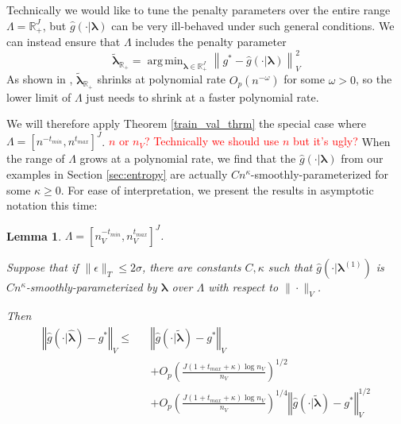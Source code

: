 \documentclass[12pt]{article}
\newtheorem{lemma}{Lemma}
\DeclareMathOperator*{\argmin}{arg\,min}
\begin{document}
Technically we would like to tune the penalty parameters over the entire range $\Lambda = \mathbb{R}^J_+$, but $\hat g(\cdot | \boldsymbol{\lambda})$ can be very ill-behaved under such general conditions. We can instead ensure that $\Lambda$ includes the penalty parameter
\begin{equation}
\label{eq:true_oracle}
\tilde{\boldsymbol{\lambda}}_{\mathbb{R}_+}
= \argmin_{\boldsymbol{\lambda} \in \mathbb{R}^J_+}\left \| g^* - \hat{g}(\cdot | \boldsymbol \lambda) \right \|^2_V
\end{equation}
As shown in \citet{van2000empirical}, $\tilde{\boldsymbol{\lambda}}_{\mathbb{R}_+}$ shrinks at polynomial rate $O_p(n^{-\omega})$ for some $\omega>0$, so the lower limit of $\Lambda$ just needs to shrink at a faster polynomial rate.

We will therefore apply Theorem \ref{train_val_thrm} the special case where $\Lambda = [n^{-t_{min}},n^{t_{max}}]^{J}$. 
\textcolor{red}{$n$ or $n_V$? Technically we should use $n$ but it's ugly?}
When the range of $\Lambda$ grows at a polynomial rate, we find that the $\hat g(\cdot | \boldsymbol{\lambda})$ from our examples in Section \ref{sec:entropy} are actually $Cn^\kappa$-smoothly-parameterized for some $\kappa \ge 0$. For ease of interpretation, we present the results in asymptotic notation this time:

\begin{lemma}
	\label{lemma:train_val_special}
	$\Lambda=[n_{V}^{-t_{min}},n_{V}^{t_{max}}]^{J}$.
	
	Suppose that if $\|\epsilon\|_{T}\le2\sigma$, there are constants
	$C,\kappa$ such that $\hat{g}(\cdot|\boldsymbol{\lambda}^{(1)})$ is $Cn^\kappa$-smoothly-parameterized by $\boldsymbol{\lambda}$ over $\Lambda$ with respect to $\|\cdot \|_V$.
	
	Then
	\begin{eqnarray}
	\left\Vert \hat{g}(\cdot|\hat{\boldsymbol{\lambda}})-g^{*}\right\Vert _{V}\le 
	&& \left\Vert \hat{g}(\cdot|\tilde{\boldsymbol{\lambda}})-g^{*}\right\Vert _{V} \label{eq:asym_train_val_theorem1} \\
	&& + O_p \left(\frac{J\left(1+t_{max}+\kappa\right)\log n_{V}}{n_{V}}\right)^{1/2} \label{eq:asym_train_val_theorem2} \\
	&& + O_p \left(\frac{J\left(1+t_{max}+\kappa\right)\log n_{V}}{n_{V}}\right)^{1/4} \left\Vert \hat{g}(\cdot|\tilde{\boldsymbol{\lambda}})-g^{*}\right\Vert _{V}^{1/2} \label{eq:asym_train_val_theorem3}
	\end{eqnarray}
\end{lemma}
\end{document}
